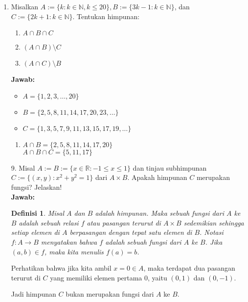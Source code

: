 \documentclass[10pt,openany,a4paper]{article}
\newtheorem{definisi}{Definisi}
\newcommand{\R}{\mathbb{R}}
\begin{document}
\begin{enumerate}
  \item Misalkan $A:=\{k:k\in\mathbb{N}, k\leq 20\}, B:=\{3k-1:k\in\mathbb{N}\}$, dan $C:=\{2k+1:k\in\mathbb{N}\}$. Tentukan himpunan:
        \begin{enumerate}
          \item $A\cap B\cap C$
          \item $(A\cap B)\setminus C$
          \item $(A\cap C)\setminus B$
        \end{enumerate}
        \textbf{Jawab:}
        \begin{itemize}
          \item $A=\{1, 2, 3, \dots, 20\}$
          \item $B=\{2, 5, 8, 11, 14, 17, 20, 23, \dots\}$
          \item $C=\{1, 3, 5, 7, 9, 11, 13, 15, 17, 19, \dots\}$
        \end{itemize}
        \begin{enumerate}
          \item $A\cap B=\{2,5,8,11,14,17,20\}$\\
                $A\cap B\cap C=\{5,11,17\}$
        \end{enumerate}

  \item[9.] Misal $A:=B:=\{x\in\R:-1\leq x\leq 1\}$ dan tinjau subhimpunan $C:=\{(x,y):x^2+y^2=1\}$ dari $A\times B$. Apakah himpunan $C$ merupakan fungsi? Jelaskan!\\
        \textbf{Jawab:}
        \begin{definisi}
          Misal $A$ dan $B$ adalah himpunan. Maka sebuah fungsi dari $A$ ke $B$ adalah sebuah relasi $f$ atau pasangan terurut di $A\times B$ sedemikian sehingga {\color{red} setiap elemen di $A$ berpasangan dengan tepat satu elemen di $B$}. Notasi $f:A\to B$ menyatakan bahwa $f$ adalah sebuah fungsi dari $A$ ke $B$. Jika $(a,b)\in f$, maka kita menulis $f(a)=b$.
        \end{definisi}
        Perhatikan bahwa jika kita ambil $x=0\in A$, maka terdapat dua pasangan terurut di $C$ yang memiliki elemen pertama $0$, yaitu $(0,1)$ dan $(0,-1)$.

        Jadi himpunan $C$ bukan merupakan fungsi dari $A$ ke $B$.


\end{enumerate}
\end{document}
